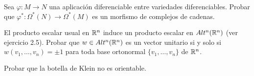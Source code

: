 \documentclass[twoside]{article}
\begin{document}
\begin{ejercicio}{9.11}
Sea $\varphi:M\to N$ una aplicación diferenciable entre variedades diferenciables. Probar que $\varphi^*:\Omega^*(N)\to\Omega^*(M)$ es un morfismo de complejos de cadenas.
\end{ejercicio}
\begin{solucion}
\end{solucion}

\newpage

\begin{ejercicio}{9.12}
El producto escalar usual en $\mathbb{R}^n$ induce un producto escalar en $Alt^n(\mathbb{R}^n)$ (ver ejercicio 2.5). Probar que $w\in Alt^n(\mathbb{R}^n)$ es un vector unitario si y solo si $w(v_1,\dots, v_n)=\pm 1$ para toda base ortonormal $\{v_1,\dots, v_n\}$ de $\mathbb{R}^n$.
\end{ejercicio}
\begin{solucion}
\end{solucion}

\newpage

\begin{ejercicio}{9.13}
Probar que la botella de Klein no es orientable.
\end{ejercicio}
\begin{solucion}
\end{solucion}
\newpage

\begin{ejercicio}{9.15}
\end{ejercicio}
\begin{solucion}
\end{solucion}
\newpage

\begin{ejercicio}{9.16}
\end{ejercicio}
\begin{solucion}
\end{solucion}
\newpage

\begin{ejercicio}{9.17}
\end{ejercicio}
\begin{solucion}
\end{solucion}
\newpage

\begin{ejercicio}{9.18}
\end{ejercicio}
\begin{solucion}
\end{solucion}
\end{document}
